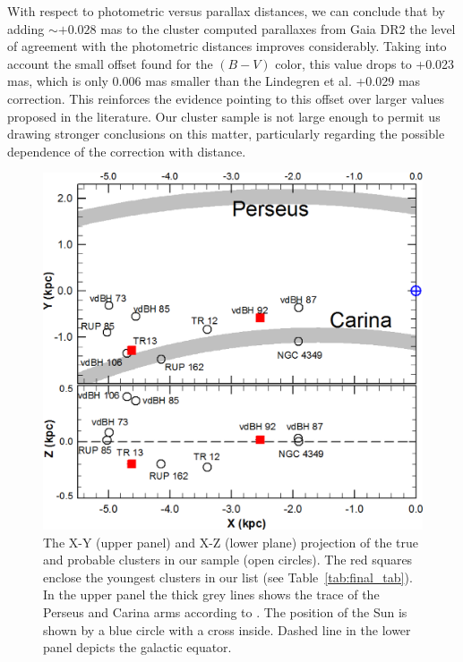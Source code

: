 \documentclass[draft]{aa}
\begin{document}
With respect to photometric versus parallax distances, we can conclude that by
adding $\sim+0.028$ mas to the cluster computed parallaxes from Gaia DR2
the level of agreement with the photometric distances improves considerably.
Taking into account the small offset found for the $(B-V)$ color, this
value drops to +0.023 mas, which is only 0.006 mas smaller than the
Lindegren et al. +0.029 mas correction.
This reinforces the evidence pointing to this offset over larger
values proposed in the literature. Our cluster sample is not large enough
to permit us drawing stronger conclusions on this matter, particularly
regarding the possible dependence of the correction with distance.


\begin{figure}[ht]
    \centering
    \includegraphics[width=\hsize]{../figs/xy_xz.png}
\caption{The X-Y (upper panel) and X-Z (lower plane) projection of the true and
probable clusters in our sample (open circles). The red squares
enclose the youngest clusters in our list (see Table~\ref{tab:final_tab}).
In the upper panel the thick grey lines shows the trace of the Perseus and
Carina arms according to \cite{valle_2005}.
The position of the Sun is shown by a blue circle with a cross inside.
Dashed line in the lower panel depicts the galactic equator.}
\label{fig68}
\end{figure}
\end{document}
